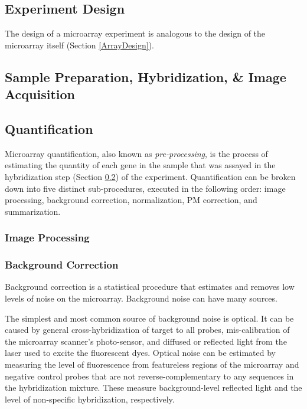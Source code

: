 {\subsection{Experiment Design}
\label{ExperimentDesign}

The design of a microarray experiment is analogous to the design of the
microarray itself (Section \ref{ArrayDesign}).


\subsection{Sample Preparation, Hybridization, \& Image Acquisition}
\label{Hybridization}

\subsection{Quantification}
\label{Quantification}

Microarray quantification, also known as \emph{pre-processing}, is the
process of estimating the quantity of each gene in the sample that was assayed
in the hybridization step (Section \ref{Hybridization}) of the experiment.
Quantification can be broken down into five distinct sub-procedures, executed
in the following order: image processing, background correction, normalization,
PM correction, and summarization.

\subsubsection{Image Processing}
\label{Image Processing}

\subsubsection{Background Correction}
\label{Background Correction}

Background correction is a statistical procedure that estimates and removes low
levels of noise on the microarray.  Background noise can have many sources.

The simplest and most common source of background noise is optical.  It can be
caused by general cross-hybridization of target to all probes, mis-calibration
of the microarray scanner's photo-sensor, and diffused or reflected light from
the laser used to excite the fluorescent dyes.  Optical noise can be estimated
by measuring the level of fluorescence from featureless regions of the
microarray and negative control probes that are not reverse-complementary to
any sequences in the hybridization mixture.  These measure background-level
reflected light and the level of non-specific hybridization, respectively.

}
